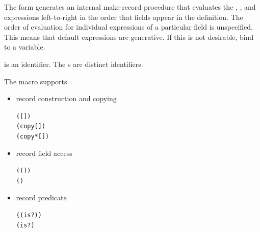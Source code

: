 The  form generates an internal make-record procedure that evaluates
the , , and  expressions left-to-right in
the order that fields appear in the definition. The order of evaluation for individual
expressions of a particular field is unspecified.  This means that default expressions are
generative. If this is not desirable, bind  to a variable.

 is an identifier. The s are distinct identifiers.

The  macro supports
\begin{itemize}

\item record construction and copying\begin{alltt}
( [ ] \etc)
( copy  [ ] \etc)
( copy*  [ ] \etc)\end{alltt}

\item record field access\begin{alltt}
(( ) )
(  )\end{alltt}
    
\item record predicate\begin{alltt}
(( is?) )
( is? )\end{alltt}

\end{itemize}
